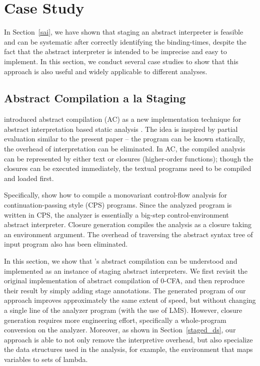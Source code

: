 \section{Case Study} \label{cases_study}

In Section~\ref{sai}, we have shown that staging an abstract interpreter is feasible and can be 
systematic after correctly identifying the binding-times, despite the fact that the abstract 
interpreter is intended to be imprecise and easy to implement. 
In this section, we conduct several case studies to show that this approach is also useful and
widely applicable to different analyses.

\subsection{Abstract Compilation a la Staging} \label{cs_ac}

\citeauthor{Boucher:1996:ACN:647473.727587} introduced abstract compilation (AC) as a new
implementation technique for abstract interpretation based static analysis \cite{Boucher:1996:ACN:647473.727587}.
The idea is inspired by partial evaluation similar to the present paper -- the program can be known 
statically, the overhead of interpretation can be eliminated. 
In AC, the compiled analysis can be represented by either text or closures (higher-order functions);
though the closures can be executed immediately, the textual programs need to be compiled and loaded first.

Specifically, \citeauthor{Boucher:1996:ACN:647473.727587} show how to compile a monovariant control-flow 
analysis \cite{Shivers:1991:SSC:115865.115884, Shivers:1988:CFA:53990.54007} 
for continuation-passing style (CPS) programs. Since the analyzed program is written in CPS, the analyzer 
is essentially a big-step control-environment abstract interpreter.
Closure generation compiles the analysis as a closure taking an environment argument.
The overhead of traversing the abstract syntax tree of input program also has been eliminated.

In this section, we show that \citeauthor{Boucher:1996:ACN:647473.727587}'s abstract compilation can be 
understood and implemented as an instance of staging abstract interpreters.
We first revisit the original implementation of abstract compilation of 0-CFA,
and then reproduce their result by simply adding stage annotations.
The generated program of our approach improves approximately the same extent of speed,
but without changing a single line of the analyzer program (with the use of LMS).
However, closure generation requires more engineering effort, specifically a whole-program 
conversion on the analyzer. Moreover, as shown in Section~\ref{staged_ds}, 
our approach is able to not only remove the interpretive overhead, but also specialize 
the data structures used in the analysis, for example, the environment that maps variables to sets of lambda.

